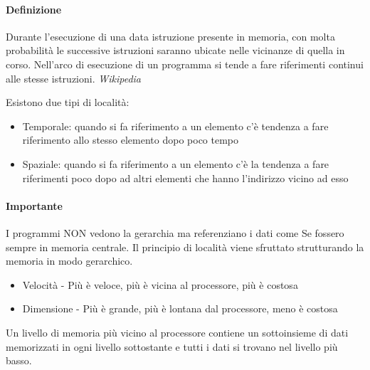 \documentclass[12pt, a4paper, openany]{book}
\begin{document}
\paragraph*{Definizione} 
\begin{displayquote}Durante l'esecuzione di una data istruzione presente in memoria, 
con molta probabilità le successive istruzioni saranno ubicate nelle vicinanze
 di quella in corso.
Nell'arco di esecuzione di un programma si tende a fare riferimenti continui 
alle stesse istruzioni. 
{\textit{Wikipedia}} 
\end{displayquote}
Esistono due tipi di località:
\begin{itemize}
    \item Temporale: quando si fa riferimento a un elemento c'è tendenza a fare
    riferimento allo stesso elemento dopo poco tempo
    \item Spaziale: quando si fa riferimento a un elemento c'è la tendenza a fare riferimenti
    poco dopo ad altri elementi che hanno l'indirizzo vicino ad esso
\end{itemize}
\paragraph*{Importante}I programmi NON vedono la gerarchia ma referenziano i dati come Se
fossero sempre in memoria centrale.
Il principio di località viene sfruttato strutturando la memoria in modo gerarchico.
\begin{itemize}
    \item Velocità - Più è veloce, più è vicina al processore, più è costosa
    \item Dimensione - Più è grande, più è lontana dal processore, meno è costosa
\end{itemize}
Un livello di memoria più vicino al processore contiene un sottoinsieme di dati memorizzati in ogni livello sottostante
e tutti i dati si trovano nel livello più basso.
\end{document}
